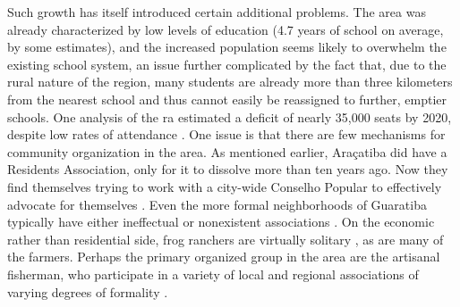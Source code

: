 Such growth has itself introduced certain additional problems. The area was already characterized by low levels of education (4.7 years of school on average, by some estimates), and the increased population seems likely to overwhelm the existing school system, an issue further complicated by the fact that, due to the rural nature of the region, many students are already more than three kilometers from the nearest school and thus cannot easily be reassigned to further, emptier schools. One analysis of the \ac{ra} estimated a deficit of nearly 35,000 seats by 2020, despite low rates of attendance \cite{pizzolatoLOCALIZACAOESCOLASPUBLICAS2013}. One issue is that there are few mechanisms for community organization in the area. As mentioned earlier, Araçatiba did have a Residents Association, only for it to dissolve more than ten years ago. Now they find themselves trying to work with a city-wide Conselho Popular to effectively advocate for themselves \cite{stroblFourCoreCriticisms2018}. Even the more formal neighborhoods of Guaratiba typically have either ineffectual or nonexistent associations \cite{herzogGuaratibaVerdeSubsidios2009}. On the economic rather than residential side, frog ranchers are virtually solitary \cite{borinUMAABORDAGEMASSOCIATIVISMO2013}, as are many of the farmers. Perhaps the primary organized group in the area are the artisanal fisherman, who participate in a variety of local and regional associations of varying degrees of formality \cite{lopesTerritorialidadesEmConflitos2013}.

